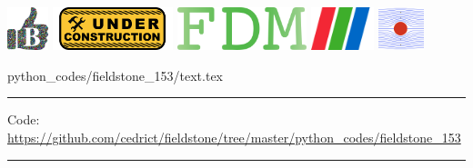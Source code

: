 \noindent
\includegraphics[height=1.25cm]{images/pictograms/benchmark}
\includegraphics[height=1.25cm]{images/pictograms/under_construction}
\includegraphics[height=1.25cm]{images/pictograms/FDM}
\includegraphics[height=1.25cm]{images/pictograms/paraview}
\includegraphics[height=1.25cm]{images/pictograms/streamfunction}



\begin{flushright} {\tiny {\color{gray} python\_codes/fieldstone\_153/text.tex}} \end{flushright}

%

\par\noindent\rule{\textwidth}{0.4pt}

\begin{center}
\inpython
{\small Code: \url{https://github.com/cedrict/fieldstone/tree/master/python_codes/fieldstone_153}}
\end{center}

\par\noindent\rule{\textwidth}{0.4pt}



